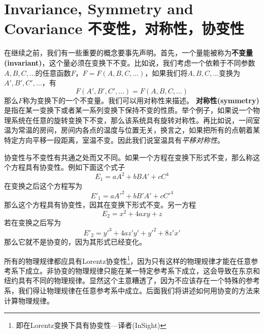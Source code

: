 \section[不变性，对称性，协变性]{Invariance, Symmetry and Covariance 不变性，对称性，协变性}
在继续之前，我们有一些重要的概念要事先声明。首先，一个量能被称为{\bf{不变量(invariant)}}，这个量必须在变换下不变。比如说，我们考虑一个依赖于不同参数$A,B,C,\dots$的任意函数$ F$，$F=F(A,B,C,\dots)$，如果我们将$A,B,C,\dots$变换为$A',B',C',\dots$，有
\begin{equation}\label{equ2.37}
  F(A',B',C',\dots)=F(A,B,C,\dots)
\end{equation}
那么$F$称为变换下的一个不变量。我们可以用对称性来描述。
{\bf{对称性(symmetry)}}是指在某一变换下或者某一系列变换下保持不变的性质。举个例子，如果说一个物理系统在任意的旋转变换下不变，那么该系统具有旋转对称性。再比如说，一间室温为常温的房间，房间内各点的温度与位置无关，换言之，如果把所有的点朝着某特定方向平移一段距离，室温不变。因此我们说室温具有{\it{平移对称性}}。

协变性与不变性有共通之处而又不同。如果一个方程在变换下形式不变，那么称这个方程具有协变性。例如下面这个式子
\[
E_1=a A^2+bBA'+cC^4
\]
在变换之后这个方程写为
\[
E'_1=a A'^2+bB'A'+cC'^4
\]
那么这个方程具有协变性，因其在变换下形式不变。另一方程
\[
E_2=x^2+4axy+z
\]
若在变换之后写为
\[
E'_2=y'^3+4az'y'+y'^2+8z'x'
\]
那么它就不是协变的，因为其形式已经变化。

所有的物理规律都应具有Lorentz协变性\footnote{即在Lorentz变换下具有协变性---译者(InSight)}，因为只有这样的物理规律才能在任意参考系下成立。非协变的物理规律只能在某一特定参考系下成立，这会导致在东京和纽约具有不同的物理规律。显然这个主意糟透了，因为不应该存在一个特殊的参考系，我们得让物理规律在任意参考系中成立。后面我们将讲述如何用协变的方法来计算物理规律。

